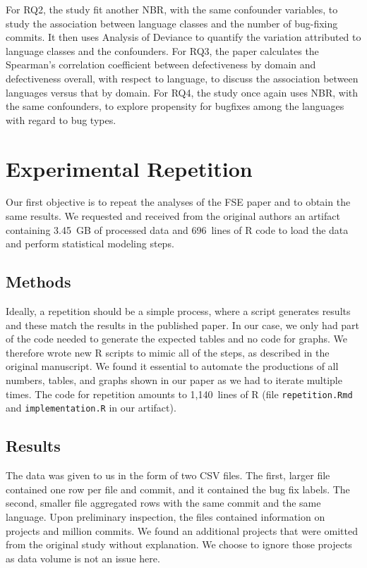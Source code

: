 \documentclass[acmsmall]{acmart}
\newcommand{\code}[1]{{\tt\small #1}\xspace}
\begin{document}
For RQ2, the study fit another NBR, with the same confounder variables, to
study the association between language classes and the number of bug-fixing
commits.  It then uses Analysis of Deviance to quantify the variation
attributed to language classes and the confounders. For RQ3, the paper
calculates the Spearman's correlation coefficient between defectiveness by
domain and defectiveness overall, with respect to language, to discuss the
association between languages versus that by domain. For RQ4, the study once
again uses NBR, with the same confounders, to explore propensity for
bugfixes among the languages with regard to bug types. 

\section{Experimental Repetition}

Our first objective is to repeat the analyses of the FSE paper and to
obtain the same results. We requested and received from the original authors
an artifact containing 3.45~GB of processed data and 696~lines of R code to
load the data and perform statistical modeling steps.

\subsection{Methods}

Ideally, a repetition should be a simple process, where a script generates
results and these match the results in the published paper. In our case, we
only had part of the code needed to generate the expected tables and no code
for graphs.  We therefore wrote new R scripts to mimic all of the steps, as
described in the original manuscript.  We found it essential to automate the
productions of all numbers, tables, and graphs shown in our paper as we had
to iterate multiple times. The code for repetition amounts to 1,140~lines of
R (file \code{\small repetition.Rmd} and \code{\small implementation.R} in
our artifact).

\subsection{Results}

The data was given to us in the form of two CSV files. The first, larger
file contained one row per file and commit, and it contained the bug fix
labels.  The second, smaller file aggregated rows with the same commit and
the same language. Upon preliminary inspection, the files contained
information on \numberOfProjectsIncluded projects and \numberCommitsMio
million commits.  We found an additional \numberOfProjectsNotIncluded
projects that were omitted from the original study without explanation.
We choose to ignore those projects as data volume is not an issue here.
\end{document}
